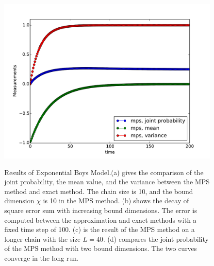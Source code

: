 \documentclass[english]{article}[12pt]
\begin{document}
\begin{figure}[H]
{\includegraphics[scale=0.4]{Result_Fig/Exponential_MPS_t200_s100_bd10.pdf}}\hfill
{}
  \caption{Results of Exponential Boys Model.(a) gives the comparison of the joint probability, the mean value, and the variance between the MPS method and exact method. The chain size is 10, and the bound dimension $\chi$ is 10 in the MPS method. (b) shows the decay of square error sum with increasing bound dimensions. The error is computed between the approximation and exact methods with a fixed time step of 100. (c) is the result of the MPS method on a longer chain with the size $L=40$. (d) compares the joint probability of the MPS method with two bound dimensions. The two curves converge in the long run.}
  \label{fig:Exponential_result}
\end{figure}
\end{document}
